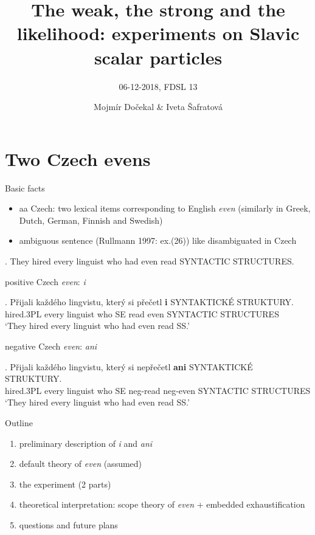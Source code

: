 \documentclass[ignorenonframetext,]{beamer}
\title{The	weak,	the	strong	and	the	
likelihood:	experiments	on	Slavic	
scalar	particles}
\subtitle{06-12-2018, FDSL 13}
\author{Mojmír Dočekal \& Iveta Šafratová}
\date{}
\providecommand{\tightlist}{%
  \setlength{\itemsep}{0pt}\setlength{\parskip}{0pt}}
\begin{document}
\frame{\titlepage}

\section{Two Czech evens}\label{two-czech-evens}

\begin{frame}{Basic facts}

\begin{itemize}
\tightlist
\item aa Czech: two lexical items corresponding to English \emph{even}
  (similarly in Greek, Dutch, German, Finnish and Swedish)
\item
  ambiguous sentence (Rullmann 1997: ex.(26)) like \Next disambiguated
  in Czech
\end{itemize}

\ex. They hired every linguist who had even read SYNTACTIC STRUCTURES.

\end{frame}

\begin{frame}

positive Czech \emph{even}: \emph{i}

\exg. Přijali každého lingvistu, který si přečetl \textbf{i} SYNTAKTICKÉ
STRUKTURY.\\
hired.3PL every linguist who SE read even SYNTACTIC STRUCTURES\\
`They hired every linguist who had even read SS.'

negative Czech \emph{even}: \emph{ani}

\exg. Přijali každého lingvistu, který si nepřečetl \textbf{ani}
SYNTAKTICKÉ STRUKTURY.\\
hired.3PL every linguist who SE neg-read neg-even SYNTACTIC STRUCTURES\\
`They hired every linguist who had even read SS.'

\end{frame}


\begin{frame}{Outline}

\begin{enumerate}
\def\labelenumi{\arabic{enumi})}
\tightlist
\item
  preliminary description of \emph{i} and \emph{ani}
\item
  default theory of \emph{even} (assumed)
\item
  the experiment (2 parts)
\item
  theoretical interpretation: scope theory of \emph{even} + embedded
  exhaustification
\item
  questions and future plans
\end{enumerate}

\end{frame}
\end{document}
